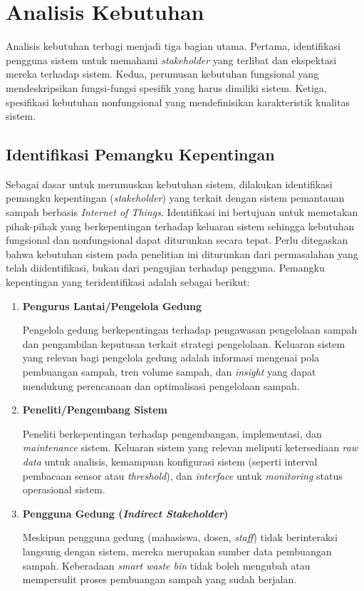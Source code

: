 \section{Analisis Kebutuhan}
\label{sec:analisis-kebutuhan}

Analisis kebutuhan terbagi menjadi tiga bagian utama. Pertama, identifikasi pengguna sistem untuk memahami \textit{stakeholder} yang terlibat dan ekspektasi mereka terhadap sistem. Kedua, perumusan kebutuhan fungsional yang mendeskripsikan fungsi-fungsi spesifik yang harus dimiliki sistem. Ketiga, spesifikasi kebutuhan nonfungsional yang mendefinisikan karakteristik kualitas sistem.

\subsection{Identifikasi Pemangku Kepentingan}

Sebagai dasar untuk merumuskan kebutuhan sistem, dilakukan identifikasi pemangku kepentingan (\textit{stakeholder}) yang terkait dengan sistem pemantauan sampah berbasis \textit{Internet of Things}. Identifikasi ini bertujuan untuk memetakan pihak-pihak yang berkepentingan terhadap keluaran sistem sehingga kebutuhan fungsional dan nonfungsional dapat diturunkan secara tepat. Perlu ditegaskan bahwa kebutuhan sistem pada penelitian ini diturunkan dari permasalahan yang telah diidentifikasi, bukan dari pengujian terhadap pengguna. Pemangku kepentingan yang teridentifikasi adalah sebagai berikut:

\begin{enumerate}
    \item \textbf{Pengurus Lantai/Pengelola Gedung}

    Pengelola gedung berkepentingan terhadap pengawasan pengelolaan sampah dan pengambilan keputusan terkait strategi pengelolaan. Keluaran sistem yang relevan bagi pengelola gedung adalah informasi mengenai pola pembuangan sampah, tren volume sampah, dan \textit{insight} yang dapat mendukung perencanaan dan optimalisasi pengelolaan sampah.

    \item \textbf{Peneliti/Pengembang Sistem}

    Peneliti berkepentingan terhadap pengembangan, implementasi, dan \textit{maintenance} sistem. Keluaran sistem yang relevan meliputi ketersediaan \textit{raw data} untuk analisis, kemampuan konfigurasi sistem (seperti interval pembacaan sensor atau \textit{threshold}), dan \textit{interface} untuk \textit{monitoring} status operasional sistem.

    \item \textbf{Pengguna Gedung (\textit{Indirect Stakeholder})}

    Meskipun pengguna gedung (mahasiswa, dosen, \textit{staff}) tidak berinteraksi langsung dengan sistem, mereka merupakan sumber data pembuangan sampah. Keberadaan \textit{smart waste bin} tidak boleh mengubah atau mempersulit proses pembuangan sampah yang sudah berjalan.
\end{enumerate}


